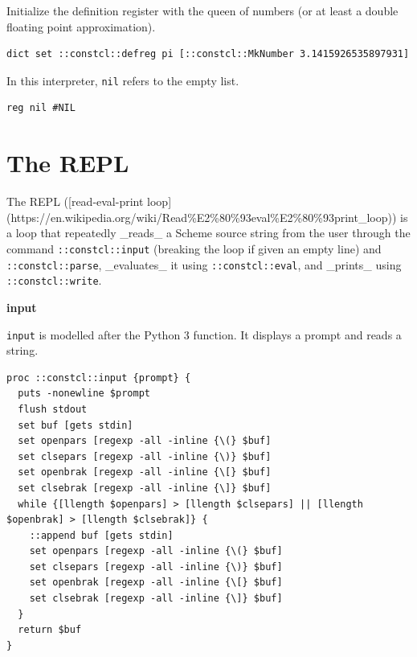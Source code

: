 \documentclass[twoside,9pt]{report}
\begin{document}
Initialize the definition register with the queen of numbers (or at least a double floating point approximation).

\noindent\makebox[\linewidth]{\rule{\linewidth}{0.4pt}}
\begin{lstlisting}
dict set ::constcl::defreg pi [::constcl::MkNumber 3.1415926535897931]
\end{lstlisting}
\noindent\makebox[\linewidth]{\rule{\linewidth}{0.4pt}}

In this interpreter, \texttt{nil} refers to the empty list.

\noindent\makebox[\linewidth]{\rule{\linewidth}{0.4pt}}
\begin{lstlisting}
reg nil #NIL
\end{lstlisting}
\noindent\makebox[\linewidth]{\rule{\linewidth}{0.4pt}}
\chapter{The REPL}
\label{the-repl}

The REPL ([read-eval-print loop](https://en.wikipedia.org/wiki/Read\%E2\%80\%93eval\%E2\%80\%93print\_loop)) is a loop that repeatedly \_reads\_ a Scheme source string from the user through the command \texttt{::constcl::input} (breaking the loop if given an empty line) and \texttt{::constcl::parse}, \_evaluates\_ it using \texttt{::constcl::eval}, and \_prints\_ using \texttt{::constcl::write}.


\textbf{input}


\texttt{input} is modelled after the Python 3 function. It displays a prompt and reads a string.

\noindent\makebox[\linewidth]{\rule{\linewidth}{0.4pt}}
\begin{lstlisting}
proc ::constcl::input {prompt} {
  puts -nonewline $prompt
  flush stdout
  set buf [gets stdin]
  set openpars [regexp -all -inline {\(} $buf]
  set clsepars [regexp -all -inline {\)} $buf]
  set openbrak [regexp -all -inline {\[} $buf]
  set clsebrak [regexp -all -inline {\]} $buf]
  while {[llength $openpars] > [llength $clsepars] || [llength $openbrak] > [llength $clsebrak]} {
    ::append buf [gets stdin]
    set openpars [regexp -all -inline {\(} $buf]
    set clsepars [regexp -all -inline {\)} $buf]
    set openbrak [regexp -all -inline {\[} $buf]
    set clsebrak [regexp -all -inline {\]} $buf]
  }
  return $buf
}
\end{lstlisting}
\noindent\makebox[\linewidth]{\rule{\linewidth}{0.4pt}}
\end{document}
